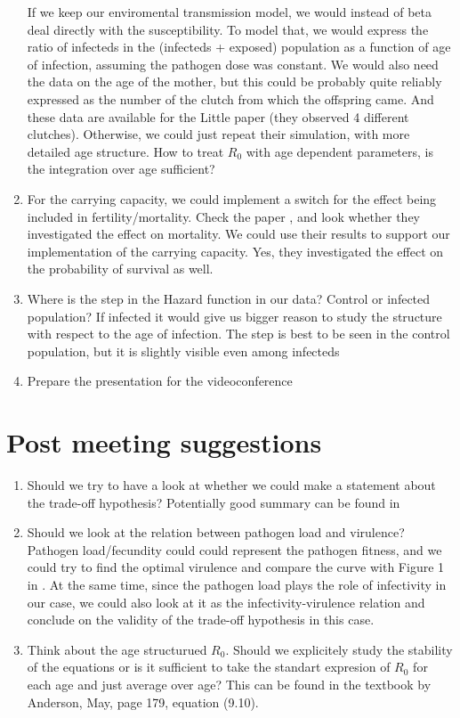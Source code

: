 \documentclass[10pt]{article}         %
\begin{document}
\begin{enumerate}
{\normalfont If we keep our enviromental transmission model, we would instead of beta deal directly with the susceptibility. To model that, we would express the ratio of infecteds in the (infecteds + exposed) population as a function of age of infection, assuming the pathogen dose was constant. We would also need the data on the age of the mother, but this could be probably quite reliably expressed as the number of the clutch from which the offspring came. And these data are available for the Little paper (they observed 4 different clutches). Otherwise, we could just repeat their simulation, with more detailed age structure. How to treat $R_0$ with age dependent parameters, is the integration over age sufficient?}
\item For the carrying capacity, we could implement a switch for the effect being included in fertility/mortality. Check the paper \cite{SPM}, and look whether they investigated the effect on mortality. We could use their results to support our implementation of the carrying capacity.\newline
{\normalfont Yes, they investigated the effect on the probability of survival as well.}
\item Where is the step in the Hazard function in our data? Control or infected population? If infected it would give us bigger reason to study the structure with respect to the age of infection.\newline
{\normalfont The step is best to be seen in the control population, but it is slightly visible even among infecteds}
\item Prepare the presentation for the videoconference
\end{enumerate}

\section{Post meeting suggestions}
\label{sec_2}
\begin{enumerate}
\item Should we try to have a look at whether we could make a statement about the trade-off hypothesis? Potentially good summary can be found in \citep{Alizon}
\item Should we look at the relation between pathogen load and virulence? Pathogen load/fecundity could could represent the pathogen fitness, and we could try to find the optimal virulence and compare the curve with Figure 1 in \citep{trade-off_sceptic}. At the same time, since the pathogen load plays the role of infectivity in our case, we could also look at it as the infectivity-virulence relation and conclude on the validity of the trade-off hypothesis in this case.
\item Think about the age structurued $R_0$. Should we explicitely study the stability of the equations or is it sufficient to take the standart expresion of $R_0$ for each age and just average over age? This can be found in the textbook by Anderson, May, page 179, equation (9.10).
\end{enumerate}



\end{document}
